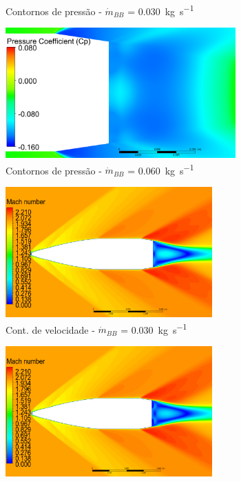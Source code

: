 \begin{figure}[!htpb]
\begin{subfigure}[b]{0.47\textwidth}
        \caption{Contornos de pressão - \(\Dot{m}_{BB}\) = \qty{0,030}{\kilogram\per\second}}
        \label{fig:contorno-pressao-base-bb-1500K-vazao0030}
    \end{subfigure}
    \hfill
    \begin{subfigure}[b]{0.47\textwidth} %
        \centering
        \includegraphics[height=5cm,width=\textwidth]{coeficientepressao-vazao0060-temp1500-diam2pol.png}
        \caption{Contornos de pressão - \(\Dot{m}_{BB}\) = \qty{0,060}{\kilogram\per\second}}
        \label{fig:contorno-pressao-base-bb-1500K-vazao0060}
    \end{subfigure}
    \hfill
    \begin{subfigure}[b]{0.47\textwidth} %
        \centering
        \includegraphics[height=5cm,width=\textwidth]{contorno-velocidade-1500K-vazao-0030-2pol.png}
        \caption{Cont. de velocidade - \(\Dot{m}_{BB}\) = \qty{0,030}{\kilogram\per\second}}
        \label{fig:contorno-velocidade-bb-1500K-vazao0030}
    \end{subfigure}
    \hfill
	\begin{subfigure}[b]{0.47\textwidth} %
        \centering
        \includegraphics[height=5cm,width=\textwidth]{contorno-velocidade-1500K-vazao-0060-2pol.png}

\end{subfigure}
\end{figure}
